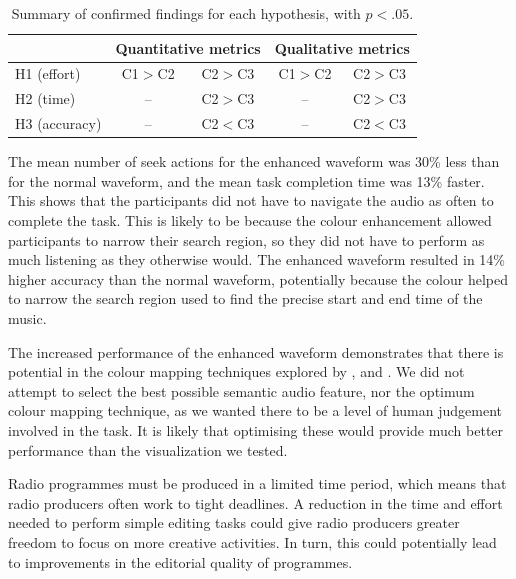 \begin{table}[h]
  \centering
  \begin{tabular}{l | c c | c c}
    \hline
    & \multicolumn{2}{c|}{Quantitative metrics} & \multicolumn{2}{c}{Qualitative metrics} \\
    \hline
    H1 (effort)   & C1$>$C2 & C2$>$C3 & C1$>$C2 & C2$>$C3 \\
    H2 (time)     & --      & C2$>$C3 & --      & C2$>$C3 \\
    H3 (accuracy) & --      & C2$<$C3 & --      & C2$<$C3 \\
    \hline
  \end{tabular}
  \caption{Summary of confirmed findings for each hypothesis, with $p<.05$.}
  \label{tab:hypotheses}
\end{table}

The mean number of seek actions for the enhanced waveform was 30\% less than for the normal waveform, and the mean task
completion time was 13\% faster. This shows that the participants did not have to navigate the audio as often to
complete the task. This is likely to be because the colour enhancement allowed participants to narrow their search
region, so they did not have to perform as much listening as they otherwise would. The enhanced waveform resulted in
14\% higher accuracy than the normal waveform, potentially because the colour helped to narrow the search region used
to find the precise start and end time of the music.

The increased performance of the enhanced waveform demonstrates that there is potential in the colour mapping
techniques explored by \citet{Tzanetakis2000}, \citet{Rice2005} and \citet{Mason2007}. We did not attempt to select the
best possible semantic audio feature, nor the optimum colour mapping technique, as we wanted there to be a level of
human judgement involved in the task. It is likely that optimising these would provide much better performance than the
visualization we tested.

Radio programmes must be produced in a limited time period, which means that radio producers often work to tight
deadlines. A reduction in the time and effort needed to perform simple editing tasks could give radio producers greater
freedom to focus on more creative activities. In turn, this could potentially lead to improvements in the editorial
quality of programmes.

